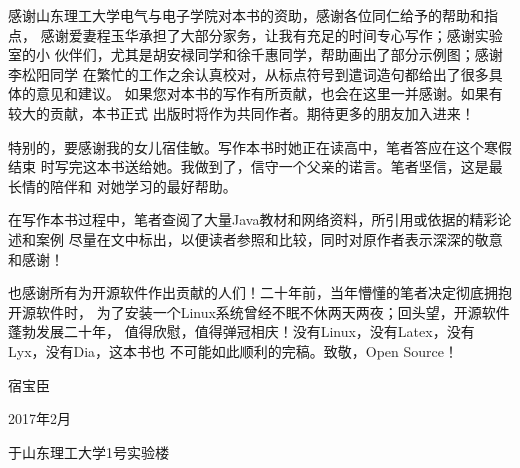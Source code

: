 感谢山东理工大学电气与电子学院对本书的资助，感谢各位同仁给予的帮助和指点，
感谢爱妻程玉华承担了大部分家务，让我有充足的时间专心写作；感谢实验室的小
伙伴们，尤其是胡安禄同学和徐千惠同学，帮助画出了部分示例图；感谢李松阳同学
在繁忙的工作之余认真校对，从标点符号到遣词造句都给出了很多具体的意见和建议。
如果您对本书的写作有所贡献，也会在这里一并感谢。如果有较大的贡献，本书正式
出版时将作为共同作者。期待更多的朋友加入进来！

特别的，要感谢我的女儿宿佳敏。写作本书时她正在读高中，笔者答应在这个寒假结束
时写完这本书送给她。我做到了，信守一个父亲的诺言。笔者坚信，这是最长情的陪伴和
对她学习的最好帮助。

在写作本书过程中，笔者查阅了大量Java教材和网络资料，所引用或依据的精彩论述和案例
尽量在文中标出，以便读者参照和比较，同时对原作者表示深深的敬意和感谢！

也感谢所有为开源软件作出贡献的人们！二十年前，当年懵懂的笔者决定彻底拥抱开源软件时，
为了安装一个Linux系统曾经不眠不休两天两夜；回头望，开源软件蓬勃发展二十年，
值得欣慰，值得弹冠相庆！没有Linux，没有Latex，没有Lyx，没有Dia，这本书也
不可能如此顺利的完稿。致敬，Open Source！

\hfill 宿宝臣

\hfill 2017年2月

\hfill 于山东理工大学1号实验楼
\mainmatter
